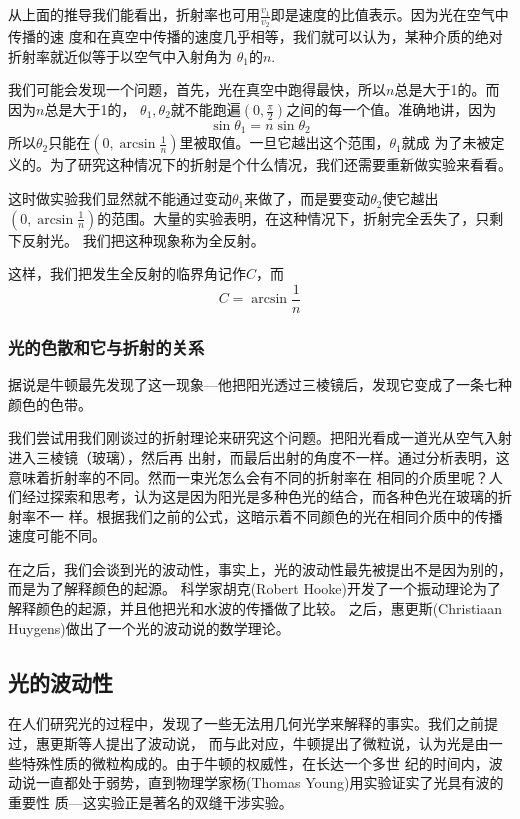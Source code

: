 从上面的推导我们能看出，折射率也可用$\frac{v_1}{v_2}$即是速度的比值表示。因为光在空气中传播的速
度和在真空中传播的速度几乎相等，我们就可以认为，某种介质的绝对折射率就近似等于以空气中入射角为
$\theta_1$的$n$. 

我们可能会发现一个问题，首先，光在真空中跑得最快，所以$n$总是大于1的。而因为$n$总是大于1的，
$\theta_1,\theta_2$就不能跑遍$(0,\frac{\pi}{2})$之间的每一个值。准确地讲，因为
\begin{equation}
\sin{\theta_1} = n\sin{\theta_2}
\end{equation}
所以$\theta_2$只能在$(0,\arcsin{\frac{1}{n}})$里被取值。一旦它越出这个范围，$\theta_1$就成
为了未被定义的。为了研究这种情况下的折射是个什么情况，我们还需要重新做实验来看看。

这时做实验我们显然就不能通过变动$\theta_1$来做了，而是要变动$\theta_2$使它越出
$(0,\arcsin{\frac{1}{n}})$的范围。大量的实验表明，在这种情况下，折射完全丢失了，只剩下反射光。
我们把这种现象称为全反射。

这样，我们把发生全反射的临界角记作$C$，而
\begin{equation}
C = \arcsin{\frac{1}{n}}
\end{equation}

\subsubsection{光的色散和它与折射的关系}
据说是牛顿最先发现了这一现象---他把阳光透过三棱镜后，发现它变成了一条七种颜色的色带。

我们尝试用我们刚谈过的折射理论来研究这个问题。把阳光看成一道光从空气入射进入三棱镜（玻璃），然后再
出射，而最后出射的角度不一样。通过分析表明，这意味着折射率的不同。然而一束光怎么会有不同的折射率在
相同的介质里呢？人们经过探索和思考，认为这是因为阳光是多种色光的结合，而各种色光在玻璃的折射率不一
样。根据我们之前的公式，这暗示着不同颜色的光在相同介质中的传播速度可能不同。

在之后，我们会谈到光的波动性，事实上，光的波动性最先被提出不是因为别的，而是为了解释颜色的起源。
科学家胡克(Robert Hooke)开发了一个振动理论为了解释颜色的起源，并且他把光和水波的传播做了比较。
之后，惠更斯(Christiaan Huygens)做出了一个光的波动说的数学理论。

\subsection{光的波动性}
在人们研究光的过程中，发现了一些无法用几何光学来解释的事实。我们之前提过，惠更斯等人提出了波动说，
而与此对应，牛顿提出了微粒说，认为光是由一些特殊性质的微粒构成的。由于牛顿的权威性，在长达一个多世
纪的时间内，波动说一直都处于弱势，直到物理学家杨(Thomas Young)用实验证实了光具有波的重要性
质---这实验正是著名的双缝干涉实验。

